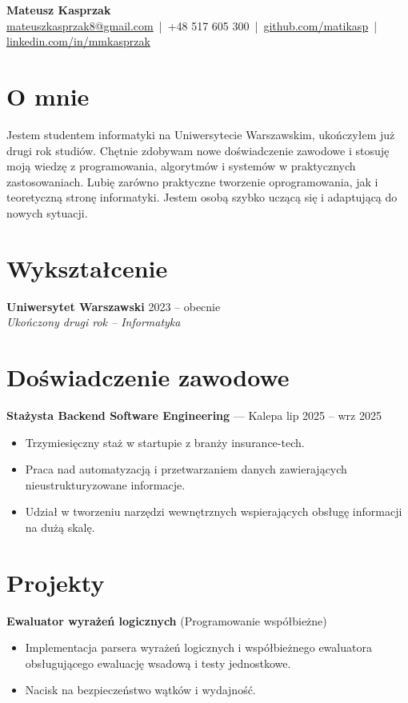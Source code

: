 \documentclass[a4paper,10pt]{article}
\begin{document}
\begin{center}
    {\LARGE \textbf{Mateusz Kasprzak}} \\[2pt]
    \href{mailto:mateuszkasprzak8@gmail.com}{mateuszkasprzak8@gmail.com} \,|\, 
    +48 517 605 300 \,|\, 
    \href{https://github.com/matikasp}{github.com/matikasp} \,|\, 
    \href{https://linkedin.com/in/mmkasprzak}{linkedin.com/in/mmkasprzak}
\end{center}
\vspace{-6pt}


\section*{O mnie}
Jestem studentem informatyki na Uniwersytecie Warszawskim, ukończyłem już drugi rok studiów. Chętnie zdobywam nowe doświadczenie zawodowe i stosuję moją wiedzę z programowania, algorytmów i systemów w praktycznych zastosowaniach. Lubię zarówno praktyczne tworzenie oprogramowania, jak i teoretyczną stronę informatyki. Jestem osobą szybko uczącą się i adaptującą do nowych sytuacji.

\section*{Wykształcenie}
\textbf{Uniwersytet Warszawski} \hfill 2023 -- obecnie \\
\emph{Ukończony drugi rok -- Informatyka}

\section*{Doświadczenie zawodowe}
\textbf{Stażysta Backend Software Engineering} — Kalepa \hfill lip 2025 -- wrz 2025
\begin{itemize}[left=0pt, noitemsep]
    \item Trzymiesięczny staż w startupie z branży insurance-tech.
    \item Praca nad automatyzacją i przetwarzaniem danych zawierających nieustrukturyzowane informacje.
    \item Udział w tworzeniu narzędzi wewnętrznych wspierających obsługę informacji na dużą skalę.
\end{itemize}

\section*{Projekty}
\textbf{Ewaluator wyrażeń logicznych} \hfill (Programowanie współbieżne)
\begin{itemize}[left=0pt, noitemsep]
    \item Implementacja parsera wyrażeń logicznych i współbieżnego ewaluatora obsługującego ewaluację wsadową i testy jednostkowe.
    \item Nacisk na bezpieczeństwo wątków i wydajność.
\end{itemize}
\end{document}
